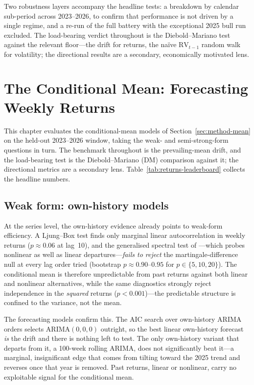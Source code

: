 \documentclass[12pt, a4paper]{article}
\begin{document}
Two robustness layers accompany the headline tests: a breakdown by calendar sub-period
across 2023--2026, to confirm that performance is not driven by a single regime, and a
re-run of the full battery with the exceptional 2025 bull run excluded. The load-bearing
verdict throughout is the Diebold--Mariano test against the relevant floor---the drift for
returns, the na\"ive \(\mathrm{RV}_{t-1}\) random walk for volatility; the directional
results are a secondary, economically motivated lens.

\section{The Conditional Mean: Forecasting Weekly Returns}
\label{sec:mean}

This chapter evaluates the conditional-mean models of Section~\ref{sec:method-mean} on the
held-out 2023--2026 window, taking the weak- and semi-strong-form questions in turn. The
benchmark throughout is the prevailing-mean drift, and the load-bearing test is the
Diebold--Mariano (DM) comparison against it; the directional metrics are a secondary lens.
Table~\ref{tab:returns-leaderboard} collects the headline numbers.

\subsection{Weak form: own-history models}

At the series level, the own-history evidence already points to weak-form efficiency. A
Ljung--Box test finds only marginal linear autocorrelation in weekly returns
(\(p \approx 0.06\) at lag~10), and the generalised spectral test of \textcite{hong2003}
---which probes nonlinear as well as linear departures---\emph{fails to reject} the
martingale-difference null at every lag order tried (bootstrap \(p \approx 0.90\text{--}0.95\)
for \(p \in \{5,10,20\}\)). The conditional mean is therefore unpredictable from past returns
against both linear and nonlinear alternatives, while the same diagnostics strongly reject
independence in the \emph{squared} returns (\(p < 0.001\))---the predictable structure is
confined to the variance, not the mean.

The forecasting models confirm this. The AIC search over own-history ARIMA orders selects
\(\mathrm{ARIMA}(0,0,0)\) outright, so the best linear own-history forecast \emph{is} the
drift and there is nothing left to test. The only own-history variant that departs from it,
a 100-week rolling ARIMA, does not significantly beat it---a marginal, insignificant edge
that comes from tilting toward the 2025 trend and reverses once that year is removed. Past
returns, linear or nonlinear, carry no exploitable signal for the conditional mean.
\end{document}

